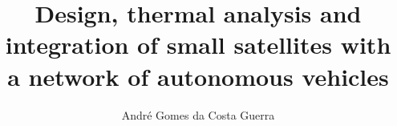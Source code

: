 \documentclass[a4paper, twoside, openright, 11pt, UKenglish]{book}
\begin{document}

\makeatletter %
    \title{Design, thermal analysis and integration of small satellites with a network of autonomous vehicles}                      \let\Title\@title
    \author{Andr\'e Gomes da Costa Guerra}    \let\Author\@author
    \date{\the\year}                          \let\Date\@date
\makeatother %


\hypertarget{FrontCover}{}

\cleardoublepage

\frontmatter
\pagestyle{plain}




\cleardoublepage


\cleardoublepage


\cleardoublepage


\cleardoublepage


\cleardoublepage


\renewcommand{\contentsname}{Contents}
\hypertarget{Contents}{}
\tableofcontents    %
\cleardoublepage

\renewcommand\listfigurename{List of Figures}
{}
\listoffigures      %
\cleardoublepage

\renewcommand\listtablename{List of Tables}
{} 
\listoftables       %
\cleardoublepage
\end{document}
